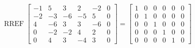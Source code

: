 \begin{exerciseAnswer} 


\[\operatorname{RREF} \left[\begin{array}{ccccc|c}
-1 & 5 & 3 & 2 & -2 & 0 \\
-2 & -3 & -6 & -5 & 5 & 0 \\
4 & -6 & 3 & 3 & -6 & 0 \\
0 & -2 & -2 & 4 & 2 & 0 \\
0 & 4 & 3 & -4 & 3 & 0
\end{array}\right] = \left[\begin{array}{ccccc|c}
1 & 0 & 0 & 0 & 0 & 0 \\
0 & 1 & 0 & 0 & 0 & 0 \\
0 & 0 & 1 & 0 & 0 & 0 \\
0 & 0 & 0 & 1 & 0 & 0 \\
0 & 0 & 0 & 0 & 1 & 0
\end{array}\right] \]



\end{exerciseAnswer}

